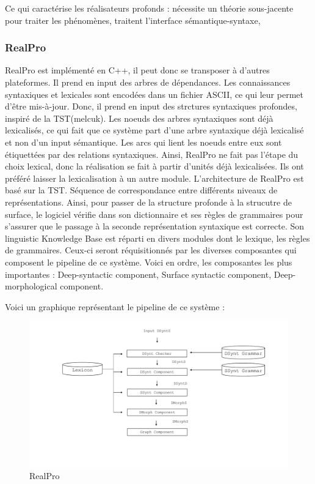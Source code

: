 Ce qui caractérise les réalisateurs profonds : nécessite un théorie sous-jacente pour traiter les phénomènes, traitent l'interface sémantique-syntaxe,

\subsubsection{RealPro}
\citep{LavoieFastPortableRealizer1997}
RealPro est implémenté en C++, il peut donc se transposer à d'autres plateformes. Il prend en input des arbres de dépendances. Les connaissances syntaxiques et lexicales sont encodées dans un fichier ASCII, ce qui leur permet d'être mis-à-jour. Donc, il prend en input des strctures syntaxiques profondes, inspiré de la TST(melcuk). Les noeuds des arbres syntaxiques sont déjà lexicalisés, ce qui fait que ce système part d'une arbre syntaxique déjà lexicalisé et non d'un input sémantique. Les arcs qui lient les noeuds entre eux sont étiquettées par des relations syntaxiques. Ainsi, RealPro ne fait pas l'étape du choix lexical, donc la réalisation se fait à partir d'unités déjà lexicalisées. Ils ont préféré laisser la lexicalisation à un autre module. L'architecture de RealPro est basé sur la TST. Séquence de correspondance entre différents niveaux de représentations. Ainsi, pour passer de la structure profonde à la strucutre de surface, le logiciel vérifie dans son dictionnaire et ses règles de grammaires pour s'assurer que le passage à la seconde représentation syntaxique est correcte. Son linguistic Knowledge Base est réparti en divers modules dont  le lexique, les règles de grammaires. Ceux-ci seront réquisitionnés par les diverses composantes qui composent le pipeline de ce système. Voici en ordre, les composantes les plus importantes : Deep-syntactic component, Surface syntactic component, Deep-morphological component.

Voici un graphique représentant le pipeline de ce système :
\begin{figure}[h]
	\centering
	\includegraphics[width=1\textwidth, trim = {0cm 0cm 0cm 0cm},clip]{ch2/figs/realpro.pdf}
	\caption{RealPro}
	\label{fig:RealPro}
\end{figure}

